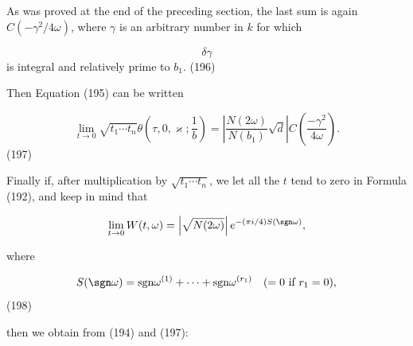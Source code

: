 As was proved at the end of the preceding section, the last sum is again $C(-\gamma^2/4\omega)$, where $\gamma$ is an arbitrary number in $k$ for which

$$\delta\gamma$$ is integral and relatively prime to $b_1$. (196)

Then Equation (195) can be written

$$\lim_{t \to 0} \sqrt{t_1 \cdots t_n} \theta\left(\tau, 0, \varkappa; \frac{1}{b}\right) = \left| \frac{N(2\omega)}{N(b_1)} \sqrt{d} \right| C\left(\frac{-\gamma^2}{4\omega}\right).$$ (197)

Finally if, after multiplication by $\sqrt{t_1 \cdots t_n}$, we let all the $t$ tend to zero in Formula (192), and keep in mind that

$$\lim_{t \to 0} W(t, \omega) = \left| \sqrt{N(2\omega)} \right| e^{-(\pi i/4)S(\sgn \omega)},$$

where

$$S(\sgn \omega) = \text{sgn} \omega^{(1)} + \cdots + \text{sgn} \omega^{(r_1)} \quad (= 0 \text{ if } r_1 = 0),$$ (198)

then we obtain from (194) and (197):
